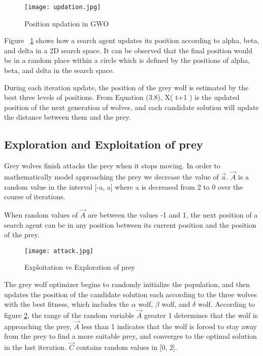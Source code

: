 \documentclass[11pt]{report}
\begin{document}
\begin{figure}[!h]
\begin{center}
     \texttt{[image: updation.jpg]}
     \caption {Position updation in GWO }
     \label{fig:updation}
\end{center}

\end{figure}

Figure ~\ref{fig:updation} shows how a search agent updates its position according to alpha, beta, and delta in a 2D search space. 
It can be observed that the final position would be in a random  place within a circle which is defined by the 
positions of alpha, beta, and delta in the search space. 
\par During each iteration update, the position of the grey
wolf is estimated by the best three levels of positions. From Equation (3.8), X( t+1 )
is the updated position of the next generation of wolves,
and each candidate solution will update the distance between
them and the prey. 

\subsection{Exploration and Exploitation of prey}
Grey wolves finish attacks the prey when it stops moving. In order to 
mathematically model approaching the prey we decrease the value of $\vec{a}$. $\vec{A}$ is a random value in the interval [-a, a] where a is decreased from 2 to 0 over the course of iterations. \par When random values of $\vec{A}$ are between the values -1 and 1, the next position of a search agent can be in any position between its current position and the position of the prey.

\begin{figure}[!h]
\begin{center}
     \texttt{[image: attack.jpg]}
     \caption {Exploitation vs Exploration of prey }
     \label{exp}
\end{center}
\end{figure}

The grey wolf optimizer begins to randomly initialize the population, and then updates the position of the candidate solution each according to the
three wolves with the best fitness, which includes the $\alpha$ wolf, $\beta$ wolf, and $\delta$ wolf. According to figure \ref{exp}, the range of the random variable $\vec{A}$ greater 1 determines that the wolf is approaching the prey, $\vec{A}$ less than 1 indicates that the wolf is forced to stay away from the prey to find a more suitable prey, and converges to the optimal solution in the last iteration. $\vec{C}$ contains  random  values  in  [0,  2].
\end{document}
